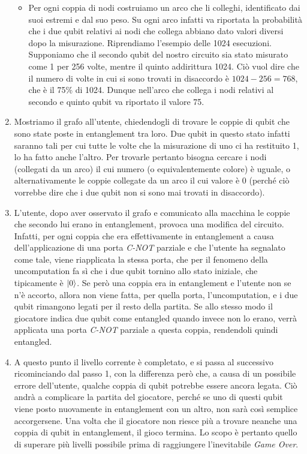 \documentclass{book}
\theoremstyle{definition}
\theoremstyle{definition}
\theoremstyle{definition}
\theoremstyle{plain}
\theoremstyle{plain}
\theoremstyle{plain}
\theoremstyle{plain}
\begin{document}
\begin{enumerate}
\begin{itemize}
        \item Per ogni coppia di nodi costruiamo un arco che li colleghi, identificato dai suoi estremi e dal suo peso. Su ogni arco infatti va riportata la probabilità che i due qubit relativi ai nodi che collega abbiano dato valori diversi dopo la misurazione. Riprendiamo l'esempio delle 1024 esecuzioni. Supponiamo che il secondo qubit del nostro circuito sia stato misurato come 1 per 256 volte, mentre il quinto addirittura 1024. Ciò vuol dire che il numero di volte in cui si sono trovati in disaccordo è $1024 - 256 = 768$, che è il 75\% di 1024. Dunque nell'arco che collega i nodi relativi al secondo e quinto qubit va riportato il valore 75.
    \end{itemize}
    \item Mostriamo il grafo all'utente, chiedendogli di trovare le coppie di qubit che sono state poste in entanglement tra loro. Due qubit in questo stato infatti saranno tali per cui tutte le volte che la misurazione di uno ci ha restituito 1, lo ha fatto anche l'altro. Per trovarle pertanto bisogna cercare i nodi (collegati da un arco) il cui numero (o equivalentemente colore) è uguale, o alternativamente le coppie collegate da un arco il cui valore è 0 (perché ciò vorrebbe dire che i due qubit non si sono mai trovati in disaccordo).
    \item L'utente, dopo aver osservato il grafo e comunicato alla macchina le coppie che secondo lui erano in entanglement, provoca una modifica del circuito. Infatti, per ogni coppia che era effettivamente in entanglement a causa dell'applicazione di una porta \emph{C-NOT} parziale e che l'utente ha segnalato come tale, viene riapplicata la stessa porta, che per il fenomeno della uncomputation fa sì che i due qubit tornino allo stato iniziale, che tipicamente è $\ket{0}$. Se però una coppia era in entanglement e l'utente non se n'è accorto, allora non viene fatta, per quella porta, l'uncomputation, e i due qubit rimangono legati per il resto della partita. Se allo stesso modo il giocatore indica due qubit come entangled quando invece non lo erano, verrà applicata una porta \emph{C-NOT} parziale a questa coppia, rendendoli quindi entangled.
    \item A questo punto il livello corrente è completato, e si passa al successivo ricominciando dal passo 1, con la differenza però che, a causa di un possibile errore dell'utente, qualche coppia di qubit potrebbe essere ancora legata. Ciò andrà a complicare la partita del giocatore, perché se uno di questi qubit viene posto nuovamente in entanglement con un altro, non sarà così semplice accorgersene. Una volta che il giocatore non riesce più a trovare neanche una coppia di qubit in entanglement, il gioco termina. Lo scopo è pertanto quello di superare più livelli possibile prima di raggiungere l'inevitabile \emph{Game Over}.
\end{enumerate}
\end{document}
